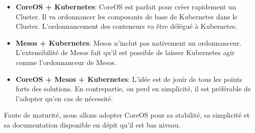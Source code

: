 \begin{itemize}
	\item \textbf{CoreOS + Kubernetes}: CoreOS est parfait pour créer rapidement un Cluster. Il va ordonnancer les composants de base de Kubernetes dans le Cluster. L'ordonnancement des conteneurs va être délégué à Kubernetes.
	\item \textbf{Mesos + Kubernetes}: Mesos n'inclut pas nativement un ordonnanceur. L'extensibilité de Mesos fait qu'il est possible de laisser Kubernetes agir comme l'ordonnanceur de Mesos.
	\item \textbf{CoreOS + Mesos + Kubernetes}: L'idée est de jouir de tous les points forts des solutions. En contrepartie, on perd en simplicité, il est préférable de l'adopter qu'en cas de nécessité.
\end{itemize}

Faute de maturité, nous allons adopter CoreOS pour sa stabilité, sa simplicité et sa documentation disponible en dépit qu'il est bas niveau.